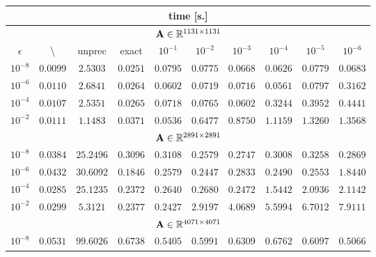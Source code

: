 \begin{table}[tbhp]
\hspace*{-1.0cm}
\centering
\vspace*{-0.2em}
\begin{tabular}{r|ccccccccc}
\hline
\multicolumn{10}{c}{time [s.]}\\
\hline
\hline
\multicolumn{10}{c}{$\mathbf{A}\in\mathbb{R}^{1131\times1131}$}\\
\hline

\multicolumn{1}{c|}{$\epsilon$} & \textbackslash & unprec & exact &  $10^{-1}$ & $10^{-2}$ & $10^{-3}$ & $10^{-4}$ & $10^{-5}$ & $10^{-6}$\\
\hline
\multicolumn{1}{c|}{$10^{-8}$} & $0.0099$ & $2.5303$  & $0.0251$  & $0.0795$   & $0.0775$ & $0.0668$ & $0.0626$ & $0.0779$ & $0.0683$\\
\multicolumn{1}{c|}{$10^{-6}$} & $0.0110$ & $2.6841$  & $0.0264$  & $0.0602$   & $0.0719$ & $0.0716$ & $0.0561$ & $0.0797$ & $0.3162$\\
\multicolumn{1}{c|}{$10^{-4}$} & $0.0107$ & $2.5351$  & $0.0265$  & $0.0718$   & $0.0765$ & $0.0602$ & $0.3244$ & $0.3952$ & $0.4441$\\
\multicolumn{1}{c|}{$10^{-2}$} & $0.0111$ & $1.1483$  & $0.0371$  & $0.0536$   & $0.6477$ & $0.8750$ & $1.1159$ & $1.3260$ & $1.3568$\\
\hline
\hline
\multicolumn{10}{c}{$\mathbf{A}\in\mathbb{R}^{2891\times2891}$}\\
\hline
\multicolumn{1}{c|}{$10^{-8}$} & $0.0384$ & $25.2496$  & $0.3096$  & $0.3108$   & $0.2579$ & $0.2747$ & $0.3008$ & $0.3258$ & $0.2869$\\
\multicolumn{1}{c|}{$10^{-6}$} & $0.0432$ & $30.6092$  & $0.1846$  & $0.2579$   & $0.2447$ & $0.2833$ & $0.2490$ & $0.2553$ & $1.8440$\\
\multicolumn{1}{c|}{$10^{-4}$} & $0.0285$ & $25.1235$  & $0.2372$  & $0.2640$   & $0.2680$ & $0.2472$ & $1.5442$ & $2.0936$ & $2.1142$\\
\multicolumn{1}{c|}{$10^{-2}$} & $0.0299$ & $5.3121$  & $0.2377$  & $0.2427$   & $2.9197$ & $4.0689$ & $5.5994$ & $6.7012$ & $7.9111$\\
\hline
\hline
\multicolumn{10}{c}{$\mathbf{A}\in\mathbb{R}^{4071\times4071}$}\\
\hline
\multicolumn{1}{c|}{$10^{-8}$} & $0.0531$ & $99.6026$  & $0.6738$  & $0.5405$   & $0.5991$ & $0.6309$  & $0.6762$  & $0.6097$  & $0.5066$\\

\end{tabular}
\end{table}
